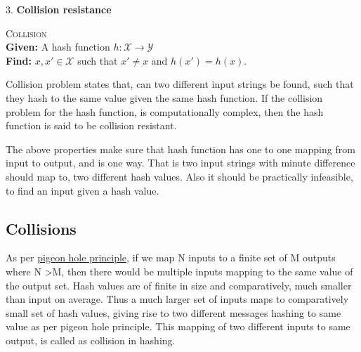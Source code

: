 3. {\bf Collision resistance}
\begin{center}
  \framebox
  {
    \parbox{300pt}
    {
      \centering \textsc{Collision} \\
      {\bf Given:} A hash function $h : \mathcal{X} \to \mathcal{Y}$ \\
      {\bf Find:} $x, x' \in \mathcal{X}$ such that $x' \neq x$ and $h(x') = h(x)$. 
    }
  }
\end{center}
\vspace{4mm}

Collision problem states that, can two different input strings be found, such that they hash to the
same value given the same hash function. If the collision problem for the hash function, is computationally
complex, then the hash function is said to be collision resistant.

The above properties make sure that hash function has one to one mapping from input to output, and is 
one way. That is two input strings with minute difference should map to, two different hash values. Also
it should be practically infeasible, to find an input given a hash value.

\subsection{Collisions}

As per \href{"http://en.wikipedia.org/wiki/Pigeonhole_principle"}{pigeon hole principle}, if we map N inputs 
to a finite set of M outputs where N \textgreater M, then there would be multiple inputs mapping to the same
value of the output set. Hash values are of finite in size and comparatively, much smaller than
input on average. Thus a much larger set of inputs maps to comparatively small set of hash values, giving
rise to two different messages hashing to same value as per pigeon hole principle. This mapping of two different
inputs to same output, is called as collision in hashing.

